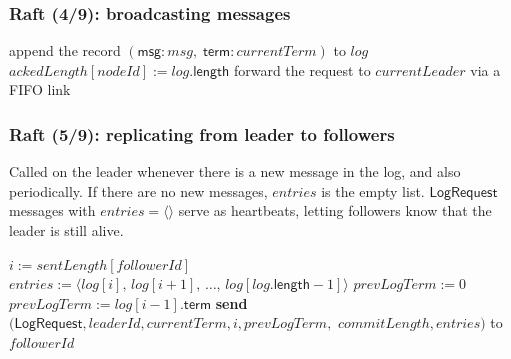 \begin{frame}
    \label{s:raft4}
    \frametitle{Raft (4/9): broadcasting messages}
    \footnotesize
    \begin{algorithmic}
        \State
                \State append the record $(\mathsf{msg}: \mathit{msg},\; \mathsf{term}: \mathit{currentTerm})$ to $\mathit{log}$
                \State $\mathit{ackedLength}[\mathit{nodeId}] := \mathit{log}.\mathsf{length}$
                    \State {}
                \EndFor
            \Else
                \State forward the request to $\mathit{currentLeader}$ via a FIFO link
            \EndIf
        \EndOn
        \State
                    \State {}
                \EndFor
            \EndIf
        \EndPeriodically
        \State
    \end{algorithmic}
\end{frame}
\label{l:raft4}

\begin{frame}
    \label{s:raft5}
    \frametitle{Raft (5/9): replicating from leader to followers}
    \footnotesize
    Called on the leader whenever there is a new message in the log, and also periodically.
    If there are no new messages, $\mathit{entries}$ is the empty list.
    $\mathsf{LogRequest}$ messages with $\mathit{entries} = \langle\rangle$ serve as heartbeats, letting followers know that the leader is still alive.\\[1em]
    \begin{algorithmic}
            \State $i := \mathit{sentLength}[\mathit{followerId}]$
            \State $\mathit{entries} := \langle\mathit{log}[i],\, \mathit{log}[i + 1],\, \dots,\, \mathit{log}[\mathit{log}.\mathsf{length} - 1]\rangle$
            \State $\mathit{prevLogTerm} := 0$
                \State $\mathit{prevLogTerm} := \mathit{log}[i - 1].\mathsf{term}$
            \EndIf
            \State \textbf{send} $(\mathsf{LogRequest}, \mathit{leaderId}, \mathit{currentTerm}, i, \mathit{prevLogTerm},$
            \State \hspace{25pt}$\mathit{commitLength}, \mathit{entries})$ to $\mathit{followerId}$
        \EndFunction
        \State
    \end{algorithmic}
\end{frame}
\label{l:raft5}

